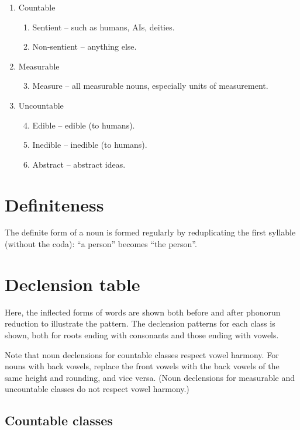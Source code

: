 \documentclass{book}
\begin{document}
\begin{enumerate}
  \item Countable
  \begin{enumerate}
      \item Sentient -- such as humans, AIs, deities.
      \item Non-sentient -- anything else.
  \end{enumerate}
  \item Measurable
  \begin{enumerate}
      \setcounter{enumi}{2}
      \item Measure -- all measurable nouns, especially units of measurement.
  \end{enumerate}
  \item Uncountable
  \begin{enumerate}
      \setcounter{enumi}{3}
      \item Edible -- edible (to humans).
      \item Inedible -- inedible (to humans).
      \item Abstract -- abstract ideas.
  \end{enumerate}
\end{enumerate}

\section{Definiteness}

The definite form of a noun is formed regularly by reduplicating the first syllable (without the coda):  ``a person'' becomes  ``the person''.

\section{Declension table}

Here, the inflected forms of words are shown both before and after phonorun reduction to illustrate the pattern. The declension patterns for each class is shown, both for roots ending with consonants and those ending with vowels.

Note that noun declensions for countable classes respect vowel harmony. For nouns with back vowels, replace the front vowels with the back vowels of the same height and rounding, and vice versa. (Noun declensions for measurable and uncountable classes do not respect vowel harmony.)

\subsection{Countable classes}
\end{document}
